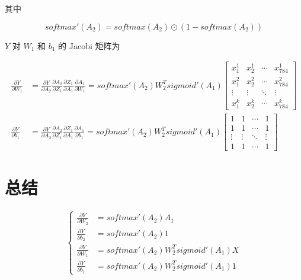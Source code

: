 \documentclass[12pt,a4paper]{amsart}
\begin{document}
其中

\begin{equation}
	softmax'(A_2) = softmax(A_2) \odot (1 - softmax(A_2))
\end{equation}

$Y$ 对 $W_1$ 和 $b_1$ 的 Jacobi 矩阵为

\begin{equation}
	\begin{aligned}
		\frac{\partial Y}{\partial W_1} & = \frac{\partial Y}{\partial A_2} \frac{\partial A_2}{\partial Z_1} \frac{\partial Z_1}{\partial A_1} \frac{\partial A_1}{\partial W_1} = softmax'(A_2) W_2^T sigmoid'(A_1) \begin{bmatrix}
			x_1^1  & x_2^1  & \cdots & x_{784}^1 \\
			x_1^2  & x_2^2  & \cdots & x_{784}^2 \\
			\vdots & \vdots & \ddots & \vdots    \\
			x_1^k  & x_2^k  & \cdots & x_{784}^k
		\end{bmatrix} \\
		\frac{\partial Y}{\partial b_1} & = \frac{\partial Y}{\partial A_2} \frac{\partial A_2}{\partial Z_1} \frac{\partial Z_1}{\partial A_1} \frac{\partial A_1}{\partial b_1} = softmax'(A_2) W_2^T sigmoid'(A_1) \begin{bmatrix}
			1      & 1      & \cdots & 1      \\
			1      & 1      & \cdots & 1      \\
			\vdots & \vdots & \ddots & \vdots \\
			1      & 1      & \cdots & 1
		\end{bmatrix}
	\end{aligned}
\end{equation}

\section{总结}

\begin{equation}
	\left\{
	\begin{aligned}
		\frac{\partial Y}{\partial W_2} & = softmax'(A_2) A_1                   \\
		\frac{\partial Y}{\partial b_2} & = softmax'(A_2) 1                     \\
		\frac{\partial Y}{\partial W_1} & = softmax'(A_2) W_2^T sigmoid'(A_1) X \\
		\frac{\partial Y}{\partial b_1} & = softmax'(A_2) W_2^T sigmoid'(A_1) 1
	\end{aligned}
	\right.
\end{equation}
\end{document}
